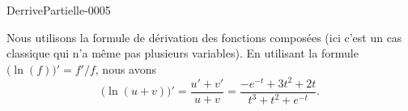 
\begin{corrige}{DerrivePartielle-0005}

	Nous utilisons la formule de dérivation des fonctions composées (ici c'est un cas classique qui n'a même pas plusieurs variables). En utilisant la formule $\big( \ln(f) \big)'=f'/f$, nous avons
	\begin{equation}
		\big( \ln(u+v) \big)'=\frac{ u'+v' }{ u+v }=\frac{ - e^{-t}+3t^2+2t }{ t^3+t^2+ e^{-t} }.
	\end{equation}

\end{corrige}
